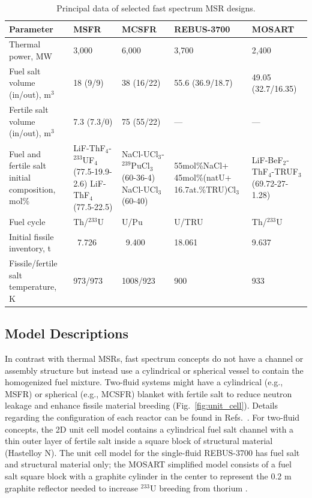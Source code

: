 \documentclass[letterpaper]{mandc2019}
\begin{document}
\begin{table}[t!]
\vspace{-0.3in}
  \centering
  \caption{Principal data of selected fast spectrum \gls{MSR} designs.}
  \label{table:fsmsr_concepts}
  \begin{tabular}{p{} p{} p{} p{} p{}} \toprule
   Parameter & \gls{MSFR} \cite{euratom_final_2015} & \gls{MCSFR} \cite{simmons_assessment_1974} & REBUS-3700 \cite{mourogov_potentialities_2006-1} & \gls{MOSART}  \cite{ignatiev_progress_2007}\\ \midrule
   Thermal power, MW 				&  3,000 & 6,000     & 3,700 & 2,400   \\
   Fuel salt volume (in/out), m$^3$       &18 (9/9)& 38 (16/22)& 55.6 (36.9/18.7) & 49.05 (32.7/16.35) \\
   Fertile salt volume (in/out), m$^3$ & 7.3 (7.3/0) & 75 (55/22)    & --- & --- \\
   Fuel and fertile salt initial composition, mol\% & LiF-ThF$_4$-$^{233}$UF$_4$ (77.5-19.9-2.6) LiF-ThF$_4$ \newline (77.5-22.5) & NaCl-UCl$_3$-$^{239}$PuCl$_3$ (60-36-4) \newline NaCl-UCl$_3$ \newline (60-40)
   & 55mol\%NaCl+ 45mol\%(natU+ 16.7at.\%TRU)Cl$_3$
   & LiF-BeF$_2$-ThF$_4$-TRUF$_3$  \newline (69.72-27-1.28) \\
   Fuel cycle & Th/$^{233}$U & U/Pu  & U/TRU & Th/$^{233}$U \\
   Initial fissile inventory, t & \ 7.726 & \ 9.400    & 18.061 & 9.637 \\ 
   Fissile/fertile salt temperature, K & 973/973 & 1008/923 & 900 & 933 \\ \bottomrule
   \end{tabular}
\end{table}
\subsection{Model Descriptions}
\label{sec:model}
In contrast with thermal \gls{MSR}s, fast spectrum concepts do not have a channel or assembly structure but instead use a cylindrical or spherical vessel to contain the homogenized fuel mixture.
Two-fluid systems might have a cylindrical (e.g., \gls{MSFR}) or spherical (e.g., \gls{MCSFR}) blanket with fertile salt to reduce neutron leakage and enhance fissile material breeding (Fig.~\ref{fig:unit_cell}). 
Details regarding the configuration of each reactor can be found in Refs.~\cite{euratom_final_2015, simmons_assessment_1974, mourogov_potentialities_2006-1,ignatiev_progress_2007}. 
For two-fluid concepts, the 2D unit cell model contains a cylindrical fuel salt channel with a thin outer layer of fertile salt inside a square block of structural material (Hastelloy N). 
The unit cell model for the single-fluid REBUS-3700 has fuel salt and structural material only; the \gls{MOSART} simplified model consists of a fuel salt square block with a graphite cylinder in the center to represent the 0.2 m graphite reflector needed to increase $^{233}$U breeding from thorium \cite{anshuman_chaube_arfc_2018}.
\end{document}
